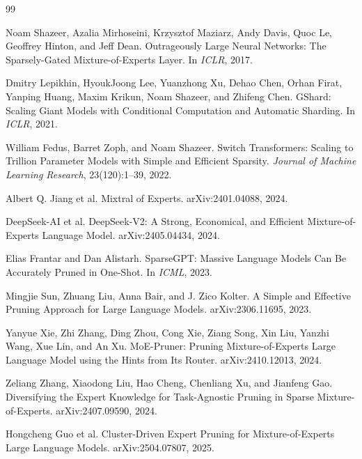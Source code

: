\documentclass[letterpaper]{article}
\begin{document}
\begin{thebibliography}{99}

Noam Shazeer, Azalia Mirhoseini, Krzysztof Maziarz, Andy Davis, Quoc Le, Geoffrey Hinton, and Jeff Dean.
\newblock Outrageously Large Neural Networks: The Sparsely-Gated Mixture-of-Experts Layer.
\newblock In \emph{ICLR}, 2017.

Dmitry Lepikhin, HyoukJoong Lee, Yuanzhong Xu, Dehao Chen, Orhan Firat, Yanping Huang, Maxim Krikun, Noam Shazeer, and Zhifeng Chen.
\newblock GShard: Scaling Giant Models with Conditional Computation and Automatic Sharding.
\newblock In \emph{ICLR}, 2021.

William Fedus, Barret Zoph, and Noam Shazeer.
\newblock Switch Transformers: Scaling to Trillion Parameter Models with Simple and Efficient Sparsity.
\newblock \emph{Journal of Machine Learning Research}, 23(120):1--39, 2022.

Albert Q. Jiang et al.
\newblock Mixtral of Experts.
\newblock arXiv:2401.04088, 2024.

DeepSeek-AI et al.
\newblock DeepSeek-V2: A Strong, Economical, and Efficient Mixture-of-Experts Language Model.
\newblock arXiv:2405.04434, 2024.

Elias Frantar and Dan Alistarh.
\newblock SparseGPT: Massive Language Models Can Be Accurately Pruned in One-Shot.
\newblock In \emph{ICML}, 2023.

Mingjie Sun, Zhuang Liu, Anna Bair, and J. Zico Kolter.
\newblock A Simple and Effective Pruning Approach for Large Language Models.
\newblock arXiv:2306.11695, 2023.

Yanyue Xie, Zhi Zhang, Ding Zhou, Cong Xie, Ziang Song, Xin Liu, Yanzhi Wang, Xue Lin, and An Xu.
\newblock MoE-Pruner: Pruning Mixture-of-Experts Large Language Model using the Hints from Its Router.
\newblock arXiv:2410.12013, 2024.

Zeliang Zhang, Xiaodong Liu, Hao Cheng, Chenliang Xu, and Jianfeng Gao.
\newblock Diversifying the Expert Knowledge for Task-Agnostic Pruning in Sparse Mixture-of-Experts.
\newblock arXiv:2407.09590, 2024.

Hongcheng Guo et al.
\newblock Cluster-Driven Expert Pruning for Mixture-of-Experts Large Language Models.
\newblock arXiv:2504.07807, 2025.

\end{thebibliography}
\end{document}
